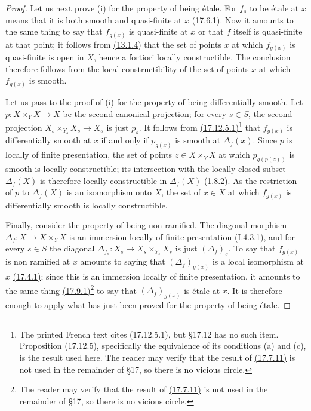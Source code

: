 \begin{proof}
Let us next prove (i) for the property of being \'etale.
For $f_s$ to be \'etale at $x$ means that it is both smooth and quasi-finite at $x$ {\hyperlink{ega4.c04.thm.17-6-1}{(17.6.1)}}.
Now it amounts to the same thing to say that $f_{g(x)}$ is quasi-finite at $x$ or that $f$ itself is quasi-finite at that point; it follows from {\hyperlink{ega4.c04.cor.13-1-4}{(13.1.4)}} that the set of points $x$ at which $f_{g(x)}$ is quasi-finite is open in $X$, hence a fortiori locally constructible.
The conclusion therefore follows from the local constructibility of the set of points $x$ at which $f_{g(x)}$ is smooth.

Let us pass to the proof of (i) for the property of being differentially smooth.
Let $p:X\times_Y X\to X$ be the second canonical projection; for every $s\in S$, the second projection $X_s\times_{Y_s}X_s\to X_s$ is just $p_s$.
It follows from {\hyperlink{ega4.c04.prop.17-12-5}{(17.12.5.1)}}\footnote{The printed French text cites (17.12.5.1), but \S17.12 has no such item. Proposition (17.12.5), specifically the equivalence of its conditions (a) and (c), is the result used here. The reader may verify that the result of {\hyperlink{ega4.c04.prop.17-7-11}{(17.7.11)}} is not used in the remainder of \S17, so there is no vicious circle.} that $f_{g(x)}$ is differentially smooth at $x$ if and only if $p_{g(x)}$ is smooth at $\Delta_f(x)$.
Since $p$ is locally of finite presentation, the set of points $z\in X\times_Y X$ at which $p_{g(p(z))}$ is smooth is locally constructible; its intersection with the locally closed subset $\Delta_f(X)$ is therefore locally constructible in $\Delta_f(X)$ {\hyperlink{ega4.c04.prop.1-8-2}{(1.8.2)}}.
As the restriction of $p$ to $\Delta_f(X)$ is an isomorphism onto $X$, the set of $x\in X$ at which $f_{g(x)}$ is differentially smooth is locally constructible.

Finally, consider the property of being non ramified.
The diagonal morphism $\Delta_f:X\to X\times_Y X$ is an immersion locally of finite presentation (I.4.3.1), and for every $s\in S$ the diagonal $\Delta_{f_s}:X_s\to X_s\times_{Y_s}X_s$ is just $(\Delta_f)_s$.
To say that $f_{g(x)}$ is non ramified at $x$ amounts to saying that $(\Delta_f)_{g(x)}$ is a local isomorphism at $x$ {\hyperlink{ega4.c04.thm.17-4-1}{(17.4.1)}}; since this is an immersion locally of finite presentation, it amounts to the same thing {\hyperlink{ega4.c04.thm.17-9-1}{(17.9.1)}}\footnote{The reader may verify that the result of {\hyperlink{ega4.c04.prop.17-7-11}{(17.7.11)}} is not used in the remainder of \S17, so there is no vicious circle.} to say that $(\Delta_f)_{g(x)}$ is \'etale at $x$.
It is therefore enough to apply what has just been proved for the property of being \'etale.
\end{proof}


